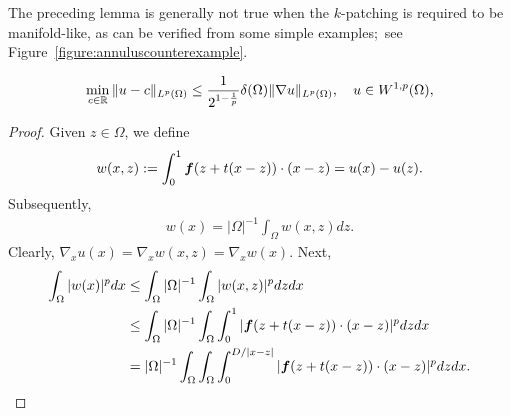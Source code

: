 \documentclass[10pt,a4paper]{article}
\begin{document}
The preceding lemma is generally not true when the $k$-patching is required to be manifold-like,
as can be verified from some simple examples;~see Figure~\ref{figure:annuluscounterexample}.

\color{Emerald}
\begin{align}
    \min\limits_{ c \in {\mathbb R} }
    \| u - c \|_{L^{p}(\Omega)}
    \leq 
    \frac{1}{ 2^{ 1 - \frac{1}{p} } }
    {\delta}(\Omega)
    \| \nabla u \|_{L^{p}(\Omega)}
    ,
    \quad 
    u \in W^{1,p}(\Omega)
    ,
\end{align}

\begin{proof}
    Given $z \in \Omega$, we define 
    \[
        w(x,z) 
        := 
        \int_0^1 \bm{f}( z + t(x-z) ) \cdot (x-z)
        =
        u(x) - u(z)
        .
    \]
    Subsequently,
    \begin{align*}
        w(x) = |\Omega|^{-1} \int_{\Omega} w(x,z) dz.
    \end{align*}
    Clearly, $\nabla_{x} u(x) = \nabla_{x} w(x,z) = \nabla_{x} w(x)$.
    Next, 
    \begin{align*}
        \int_{\Omega} | w(x) |^{p} dx
        &\leq 
        \int_{\Omega} |\Omega|^{-1} \int_{\Omega} | w(x,z) |^{p} dz dx
        \\&\leq 
        \int_{\Omega} |\Omega|^{-1} \int_{\Omega} \int_0^1 | \bm{f}( z + t(x-z) ) \cdot (x-z) |^{p} dz dx
        \\&= 
        |\Omega|^{-1} \int_{\Omega} \int_{\Omega} \int_0^{D/|x-z|} | \bm{f}( z + t(x-z) ) \cdot (x-z) |^{p} dz dx
        .
    \end{align*}

\end{proof}
\color{black}
\end{document}
